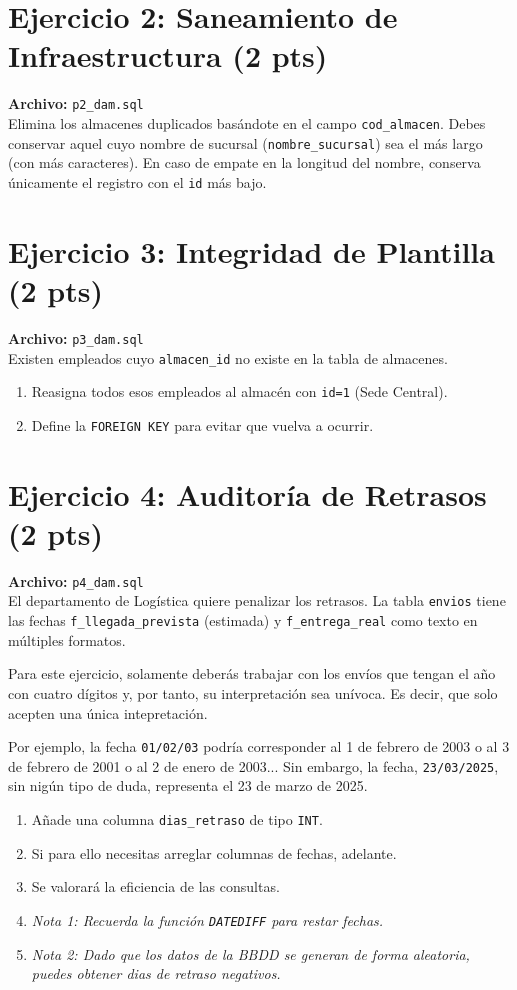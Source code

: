 \documentclass[12pt,a4paper]{article}
\begin{document}
\section{Ejercicio 2: Saneamiento de Infraestructura (2 pts)}
\textbf{Archivo:} \texttt{p2\_dam.sql} \\
Elimina los almacenes duplicados basándote en el campo \texttt{cod\_almacen}. Debes conservar aquel cuyo nombre de sucursal (\texttt{nombre\_sucursal}) sea el más largo (con más caracteres). En caso de empate en la longitud del nombre, conserva únicamente el registro con el \texttt{id} más bajo.

\section{Ejercicio 3: Integridad de Plantilla (2 pts)}
\textbf{Archivo:} \texttt{p3\_dam.sql} \\
Existen empleados cuyo \texttt{almacen\_id} no existe en la tabla de almacenes.
\begin{enumerate}
    \item Reasigna todos esos empleados al almacén con \texttt{id=1} (Sede Central).
    \item Define la \texttt{FOREIGN KEY} para evitar que vuelva a ocurrir.
\end{enumerate}

\section{Ejercicio 4: Auditoría de Retrasos (2 pts)}
\textbf{Archivo:} \texttt{p4\_dam.sql} \\
El departamento de Logística quiere penalizar los retrasos. La tabla \texttt{envios} tiene las fechas \texttt{f\_llegada\_prevista} (estimada) y \texttt{f\_entrega\_real} como texto en múltiples formatos.

Para este ejercicio, solamente deberás trabajar con los envíos que tengan el año con cuatro dígitos y, por tanto, su interpretación sea unívoca. Es decir, que solo acepten una única intepretación. 

Por ejemplo, la fecha \texttt{01/02/03} podría corresponder al 1 de febrero de 2003 o al 3 de febrero de 2001 o al 2 de enero de 2003... Sin embargo, la fecha, \texttt{23/03/2025}, sin nigún tipo de duda, representa el 23 de marzo de 2025.

\begin{enumerate}
    \item Añade una columna \texttt{dias\_retraso} de tipo \texttt{INT}.
    \item Si para ello necesitas arreglar columnas de fechas, adelante.
    \item Se valorará la eficiencia de las consultas.
    \item \textit{Nota 1: Recuerda la función \texttt{DATEDIFF} para restar fechas.}
    \item \textit{Nota 2: Dado que los datos de la BBDD se generan de forma aleatoria, puedes obtener dias de retraso negativos.}
\end{enumerate}
\end{document}
